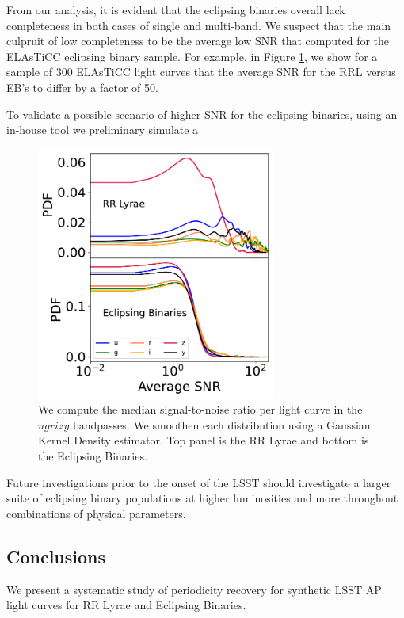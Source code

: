 \documentclass[DM,authoryear,toc]{lsstdoc}
\begin{document}
From our analysis, it is evident that the eclipsing binaries overall lack completeness in both cases of single and multi-band. We suspect that the main culpruit of low completeness to be the average low SNR that computed for the ELAsTiCC eclipsing binary sample. For example, in Figure \ref{fig:snr_average}, we show for a sample of 300 ELAsTiCC light curves that the average SNR for the RRL versus EB's to differ by a factor of 50. 

To validate a possible scenario of higher SNR for the eclipsing binaries, using an in-house tool we preliminary simulate a 

\begin{figure}
  \includegraphics[width=0.7\textwidth]{figures/snr_average.pdf}
  \centering 
  \caption{We compute the median signal-to-noise ratio per light curve in the $ugrizy$ bandpasses.  We smoothen each distribution using a Gaussian Kernel Density estimator. Top panel is the RR Lyrae and bottom is the Eclipsing Binaries. }
  \label{fig:snr_average}
\end{figure}



Future investigations prior to the onset of the LSST should investigate a larger suite of eclipsing binary populations at higher luminosities and more throughout  combinations of physical parameters. 

\subsection{Conclusions}

We present a systematic study of periodicity recovery for synthetic LSST AP light curves for RR Lyrae and Eclipsing Binaries.
\end{document}
